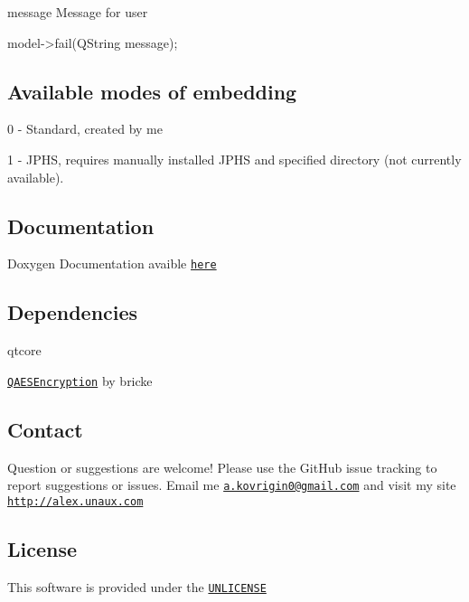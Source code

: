 message Message for user 
\begin{DoxyCode}
model->fail(QString message);
\end{DoxyCode}


\subsection*{Available modes of embedding}


\begin{DoxyItemize}
\item 0 -\/ Standard, created by me
\item 1 -\/ J\+P\+HS, requires manually installed J\+P\+HS and specified directory (not currently available).
\end{DoxyItemize}

\subsection*{Documentation}

Doxygen Documentation avaible \href{https://waleko.github.io/doc/picturecrypt}{\tt here}

\subsection*{Dependencies}


\begin{DoxyItemize}
\item qtcore
\item \href{https://github.com/bricke/Qt-AES}{\tt Q\+A\+E\+S\+Encryption} by bricke
\end{DoxyItemize}

\subsection*{Contact}

Question or suggestions are welcome! Please use the Git\+Hub issue tracking to report suggestions or issues. Email me \href{mailto:a.kovrigin0@gmail.com}{\tt a.\+kovrigin0@gmail.\+com} and visit my site \href{http://alex.unaux.com}{\tt http\+://alex.\+unaux.\+com}

\subsection*{License}

This software is provided under the \href{http://unlicense.org/}{\tt U\+N\+L\+I\+C\+E\+N\+SE} 